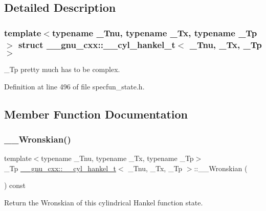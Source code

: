 \subsection{Detailed Description}
\subsubsection*{template$<$typename \+\_\+\+Tnu, typename \+\_\+\+Tx, typename \+\_\+\+Tp$>$\newline
struct \+\_\+\+\_\+gnu\+\_\+cxx\+::\+\_\+\+\_\+cyl\+\_\+hankel\+\_\+t$<$ \+\_\+\+Tnu, \+\_\+\+Tx, \+\_\+\+Tp $>$}

\+\_\+\+Tp pretty much has to be complex. 

Definition at line 496 of file specfun\+\_\+state.\+h.



\subsection{Member Function Documentation}
\mbox{\label{struct____gnu__cxx_1_1____cyl__hankel__t_a8a41c4698706cb51006f2d8ebb5d8053}} 
\subsubsection{\texorpdfstring{\+\_\+\+\_\+\+Wronskian()}{\_\_Wronskian()}}
{\footnotesize\ttfamily template$<$typename \+\_\+\+Tnu, typename \+\_\+\+Tx, typename \+\_\+\+Tp$>$ \\
\+\_\+\+Tp \hyperlink{struct____gnu__cxx_1_1____cyl__hankel__t}{\+\_\+\+\_\+gnu\+\_\+cxx\+::\+\_\+\+\_\+cyl\+\_\+hankel\+\_\+t}$<$ \+\_\+\+Tnu, \+\_\+\+Tx, \+\_\+\+Tp $>$\+::\+\_\+\+\_\+\+Wronskian (\begin{DoxyParamCaption}{ }\end{DoxyParamCaption}) const\hspace{0.3cm}{\ttfamily [inline]}}



Return the Wronskian of this cylindrical Hankel function state. 



